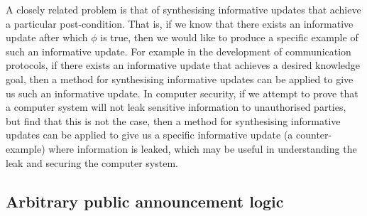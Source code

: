 A closely related problem is that of synthesising informative updates that achieve a particular post-condition.
That is, if we know that there exists an informative update after which $\phi$ is true, then we would like to produce a specific example of such an informative update.
For example in the development of communication protocols, if there exists an informative update that achieves a desired knowledge goal, then a method for synthesising informative updates can be applied to give us such an informative update.
In computer security, if we attempt to prove that a computer system will not leak sensitive information to unauthorised parties, but find that this is not the case, then a method for synthesising informative updates can be applied to give us a specific informative update (a counter-example) where information is leaked, which may be useful in understanding the leak and securing the
computer system.

\subsection{Arbitrary public announcement logic}

